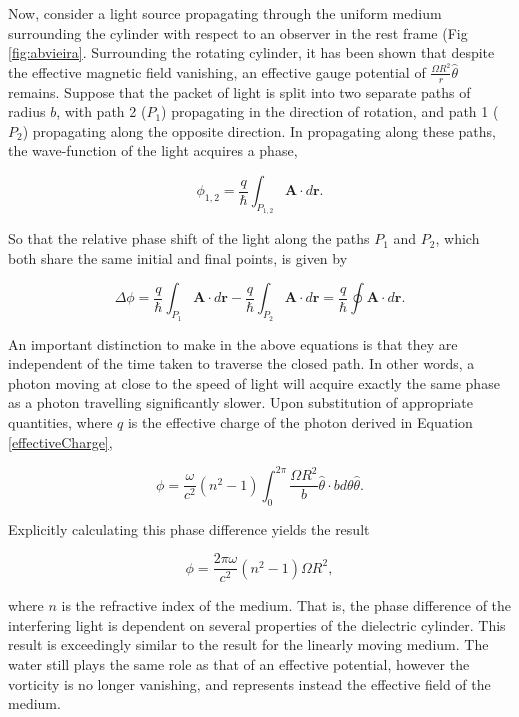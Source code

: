 Now, consider a light source propagating through the uniform medium surrounding the cylinder with respect to an observer in the rest frame (Fig \ref{fig:abvieira}. Surrounding the rotating cylinder, it has been shown that despite the effective magnetic field vanishing, an effective gauge potential of $\frac{\Omega R^2}{r} \hat{\theta}$ remains. Suppose that the packet of light is split into two separate paths of radius $b$, with path 2 ($P_1$) propagating in the direction of rotation, and path 1 ($P_2$) propagating along the opposite direction. In propagating along these paths, the wave-function of the light acquires a phase,

\begin{equation}
\phi_{1,2} = \dfrac{q}{\hbar} \int_{P_{1,2}}^{} \boldsymbol{A} \cdot d\boldsymbol{r}.
\end{equation}

So that the relative phase shift of the light along the paths $P_1$ and $P_2$, which both share the same initial and final points, is given by

\begin{equation}
\Delta \phi = \dfrac{q}{\hbar} \int_{P_1}^{} \boldsymbol{A} \cdot d\boldsymbol{r} - \dfrac{q}{\hbar} \int_{P_2}^{} \boldsymbol{A} \cdot d\boldsymbol{r} = \dfrac{q}{\hbar} \oint  \boldsymbol{A} \cdot d\boldsymbol{r}.
\end{equation}

An important distinction to make in the above equations is that they are independent of the time taken to traverse the closed path. In other words, a photon moving at close to the speed of light will acquire exactly the same phase as a photon travelling significantly slower.
Upon substitution of appropriate quantities, where $q$ is the effective charge of the photon derived in Equation \ref{effectiveCharge},

\begin{equation}
\phi = \dfrac{\omega}{c^2}(n^2 - 1) \int_{0}^{2\pi} \frac{\Omega R^2}{b} \hat{\theta} \cdot b d\theta \hat{\theta}.
\end{equation}

Explicitly calculating this phase difference yields the result

\begin{equation}
\phi = \dfrac{2 \pi \omega}{c^2} (n^2 - 1) \Omega R^2,
\end{equation}

where $n$ is the refractive index of the medium. That is, the phase difference of the interfering light is dependent on several properties of the dielectric cylinder. This result is exceedingly similar to the result for the linearly moving medium. The water still plays the same role as that of an effective potential, however the vorticity is no longer vanishing, and represents instead the effective field of the medium.

